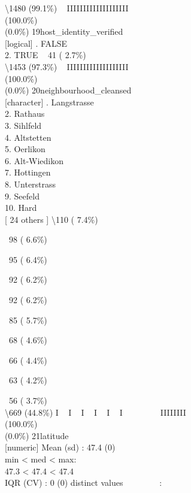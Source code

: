 \documentclass[
  journal,
]{IEEEtran}%
\begin{document}
\textbackslash1480 (99.1\%) \textbar{} \textbar~ IIIIIIIIIIIIIIIIIII
\\
(100.0\%) \\
(0.0\%) \textbar{} \textbar{} 19\textbar host\_identity\_verified\\
{[}logical{]} . FALSE\\
2. TRUE \textbar~ 41 ( 2.7\%)\\
\textbackslash1453 (97.3\%) \textbar{} \textbar~ IIIIIIIIIIIIIIIIIII
\\
(100.0\%) \\
(0.0\%) \textbar{} \textbar{} 20\textbar neighbourhood\_cleansed\\
{[}character{]} . Langstrasse\\
2. Rathaus\\
3. Sihlfeld\\
4. Altstetten\\
5. Oerlikon\\
6. Alt-Wiedikon\\
7. Hottingen\\
8. Unterstrass\\
9. Seefeld\\
10. Hard\\
{[} 24 others {]} \textbar\textbackslash110 ( 7.4\%)\\
\strut ~98 ( 6.6\%)\\
\strut ~95 ( 6.4\%)\\
\strut ~92 ( 6.2\%)\\
\strut ~92 ( 6.2\%)\\
\strut ~85 ( 5.7\%)\\
\strut ~68 ( 4.6\%)\\
\strut ~66 ( 4.4\%)\\
\strut ~63 ( 4.2\%)\\
\strut ~56 ( 3.7\%)\\
\textbackslash669 (44.8\%) \textbar{} \textbar I ~ I ~ I ~ I ~ I ~ I ~ ~
~ ~ ~ IIIIIIII \\
(100.0\%) \\
(0.0\%) \textbar{} \textbar{} 21\textbar latitude\\
{[}numeric{]} \textbar Mean (sd) : 47.4 (0)\\
min \textless{} med \textless{} max:\\
47.3 \textless{} 47.4 \textless{} 47.4\\
IQR (CV) : 0 (0)  distinct values \textbar{}
\textbar~~~~~~~~:\\
\end{document}
